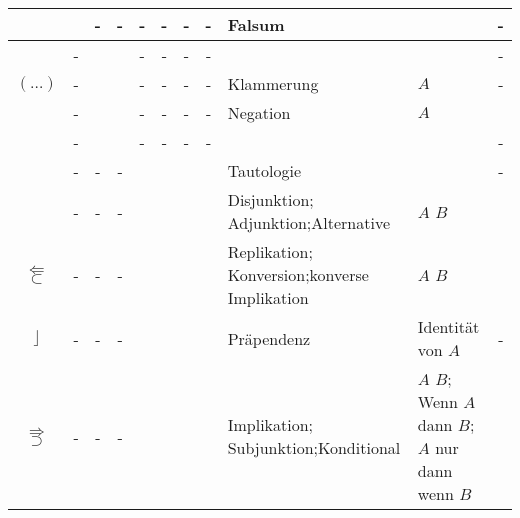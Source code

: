 \begin{table}[p]
\begin{threeparttable}
\begin{tabularx}{\linewidth}{|c||c:cc:cccc|X:X|c|}
			\tableline%
			& \textfalse & - & - & - & - & - & -
			& Falsum
			&  & - \\
			\hline\hline%
			& - & \texttrue & \texttrue  & - & - & - & - & & & - \\
			\tableline%
			$(\dots)$
			& - & \texttrue & \textfalse & - & - & - & -
			& Klammerung
			& $A$  & - \\
			\tableline%
			& - & \textfalse & \texttrue  & - & - & - & -
			& Negation
			&  $A$ & \thepnot{} \\
			\tableline%
			& - & \textfalse & \textfalse & - & - & - & - & & & -  \\
			\hline\hline%
			& - & - & - &\texttrue&\texttrue&\texttrue&\texttrue
			& Tautologie
			& & - \\
			\tableline%
			\defSym{\FrmOr}
			& - & - & - &\texttrue&\texttrue&\texttrue&\textfalse
			& Disjunktion; Adjunktion;\newline Alternative
			& $A$  $B$ & \thepor \\
			\tableline%
			 $\Leftarrow$ $\subset$
			& - & - & - &\texttrue&\texttrue&\textfalse&\texttrue
			& Replikation; Konversion;\newline konverse Implikation
			& $A$  $B$ & \theprep \\
			\tableline%
			$\rfloor$
			& - & - & - &\texttrue&\texttrue&\textfalse&\textfalse
			& Präpendenz
			& Identität von $A$ & - \\
			\tablegroup%
			 $\Rightarrow$ $\supset$
			& - & - & - &\texttrue&\textfalse&\texttrue&\texttrue
			& Implikation; Subjunktion;\newline Konditional
			&  $A$  $B$; Wenn $A$ dann $B$;\newline
			$A$ nur dann wenn $B$ & \thepimp \\

\end{tabularx}
\end{threeparttable}
\end{table}
